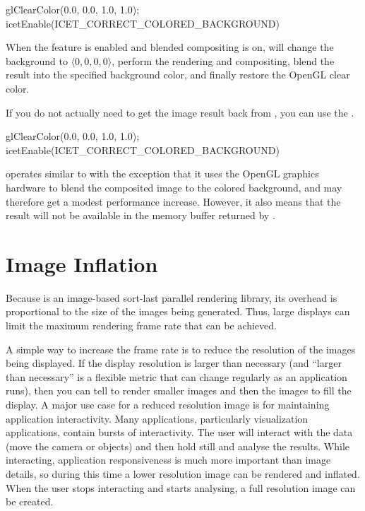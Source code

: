 \begin{code}
  glClearColor(0.0, 0.0, 1.0, 1.0);
  icetEnable(ICET_CORRECT_COLORED_BACKGROUND)
\end{code}

When the  feature is enabled and
blended compositing is on, \IceT will change the background to $\langle 0,
0, 0, 0 \rangle$, perform the rendering and compositing, blend the result
into the specified background color, and finally restore the OpenGL clear
color.

If you do not actually need to get the image result back from
, you can use the
.

\begin{code}
  glClearColor(0.0, 0.0, 1.0, 1.0);
  icetEnable(ICET_CORRECT_COLORED_BACKGROUND)
\end{code}

 operates similar to
 with the exception that it uses
the OpenGL graphics hardware to blend the composited image to the colored
background, and may therefore get a modest performance increase.  However,
it also means that the result will not be available in the memory buffer
returned by .




\section{Image Inflation}
\label{sec:Customizing_Compositing:Image_Inflation}

Because \IceT is an image-based sort-last parallel
rendering library, its overhead is proportional to the size of the images
being generated.  Thus, large displays can limit the maximum rendering
frame rate that can be achieved.

A simple way to increase the frame rate is to reduce the resolution of the
images being displayed.  If the display resolution is larger than necessary
(and ``larger than necessary'' is a flexible metric that can change
regularly as an application runs), then you can tell \IceT to render
smaller images and then  the images to fill the display.
A major use case for a reduced resolution image is for maintaining
application interactivity.  Many applications, particularly visualization
applications, contain bursts of interactivity.  The user will interact with
the data (move the camera or objects) and then hold still and analyse the
results.  While interacting, application responsiveness is much more
important than image details, so during this time a lower resolution image
can be rendered and inflated.  When the user stops interacting and starts
analysing, a full resolution image can be created.

